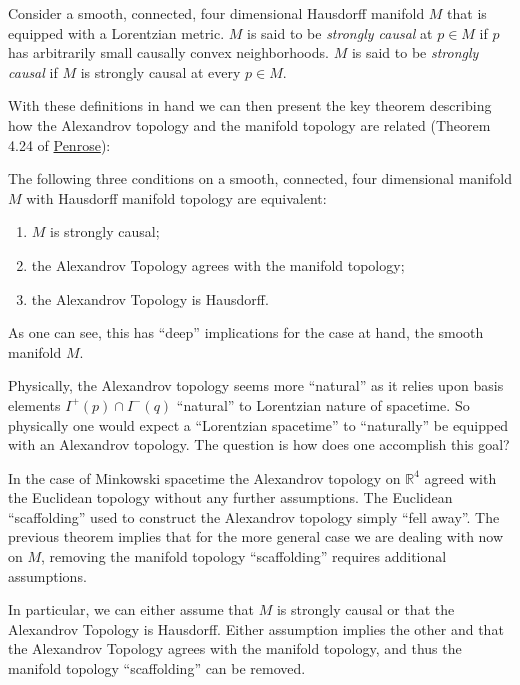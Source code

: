 \begin{definition}
    Consider a smooth, connected, four dimensional Hausdorff manifold $M$ that is equipped with a Lorentzian metric. $M$ is said to be \textit{strongly causal} at $p \in M$ if $p$ has arbitrarily small causally convex neighborhoods. $M$ is said to be \textit{strongly causal} if $M$ is strongly causal at every $p \in M$.
\end{definition}

With these definitions in hand we can then present the key theorem describing how the Alexandrov topology and the manifold topology are related (Theorem 4.24 of \href{https://doi.org/10.1137/1.9781611970609}{Penrose}):

\begin{theorem}
    The following three conditions on a smooth, connected, four dimensional manifold $M$ with Hausdorff manifold topology are equivalent:
    \begin{enumerate}
        \item $M$ is strongly causal;
        \item the Alexandrov Topology agrees with the manifold topology;
        \item the Alexandrov Topology is Hausdorff.
    \end{enumerate}
\end{theorem}

As one can see, this has ``deep'' implications for the case at hand, the smooth manifold $M$.

Physically, the Alexandrov topology seems more ``natural'' as it relies upon basis elements $I^+(p) \cap I^-(q)$ ``natural'' to Lorentzian nature of spacetime. So physically one would expect a ``Lorentzian spacetime'' to ``naturally'' be equipped with an Alexandrov topology. The question is how does one accomplish this goal?

In the case of Minkowski spacetime the Alexandrov topology on $\mathbb{R}^4$ agreed with the Euclidean topology without any further assumptions. The Euclidean ``scaffolding'' used to construct the Alexandrov topology simply ``fell away''. The previous theorem implies that for the more general case we are dealing with now on $M$, removing the manifold topology ``scaffolding'' requires additional assumptions.

In particular, we can either assume that $M$ is strongly causal or that the Alexandrov Topology is Hausdorff. Either assumption implies the other and that the Alexandrov Topology agrees with the manifold topology, and thus the manifold topology ``scaffolding'' can be removed.

